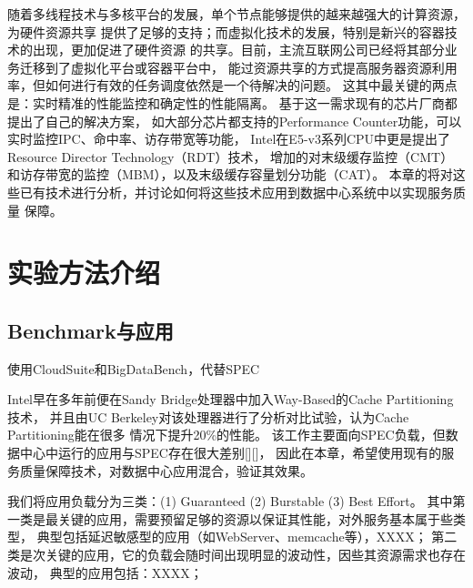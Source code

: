 
\iffalse



随着多线程技术与多核平台的发展，单个节点能够提供的越来越强大的计算资源，为硬件资源共享
提供了足够的支持；而虚拟化技术的发展，特别是新兴的容器技术的出现，更加促进了硬件资源
的共享。目前，主流互联网公司已经将其部分业务迁移到了虚拟化平台或容器平台中，
能过资源共享的方式提高服务器资源利用率，但如何进行有效的任务调度依然是一个待解决的问题。
这其中最关键的两点是：实时精准的性能监控和确定性的性能隔离。
基于这一需求现有的芯片厂商都提出了自己的解决方案， %
如大部分芯片都支持的Performance Counter功能，可以实时监控IPC、命中率、访存带宽等功能，
Intel在E5-v3系列CPU中更是提出了Resource Director Technology（RDT）技术，
增加的对末级缓存监控（CMT）和访存带宽的监控（MBM），以及末级缓存容量划分功能（CAT）。
本章的将对这些已有技术进行分析，并讨论如何将这些技术应用到数据中心系统中以实现服务质量
保障。

\section{实验方法介绍}

\subsection{Benchmark与应用}

使用CloudSuite和BigDataBench，代替SPEC

Intel早在多年前便在Sandy Bridge处理器中加入Way-Based的Cache Partitioning技术，
并且由UC Berkeley对该处理器进行了分析对比试验，认为Cache Partitioning能在很多
情况下提升20\%的性能。
该工作主要面向SPEC负载，但数据中心中运行的应用与SPEC存在很大差别[][]，
因此在本章，希望使用现有的服务质量保障技术，对数据中心应用混合，验证其效果。

我们将应用负载分为三类：(1) Guaranteed (2) Burstable (3) Best Effort。
其中第一类是最关键的应用，需要预留足够的资源以保证其性能，对外服务基本属于些类型，
典型包括延迟敏感型的应用（如WebServer、memcache等），XXXX； %
第二类是次关键的应用，它的负载会随时间出现明显的波动性，因些其资源需求也存在波动，
典型的应用包括：XXXX； %
